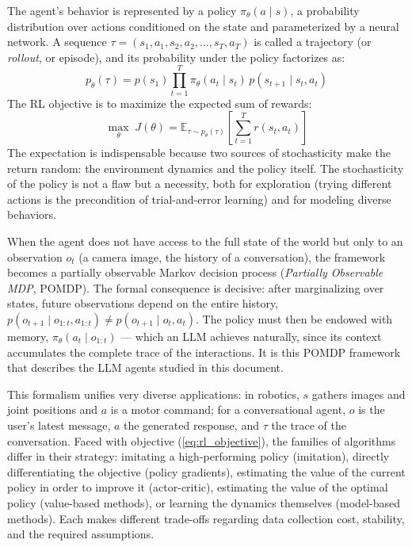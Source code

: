 \documentclass[11pt,a4paper]{article}
\begin{document}
The agent's behavior is represented by a policy $\pi_\theta(a \mid s)$, a probability distribution over actions conditioned on the state and parameterized by a neural network. A sequence $\tau = (s_1, a_1, s_2, a_2, \dots, s_T, a_T)$ is called a trajectory (or \emph{rollout}, or episode), and its probability under the policy factorizes as:
\begin{equation}
p_\theta(\tau) = p(s_1) \prod_{t=1}^{T} \pi_\theta(a_t \mid s_t)\, p(s_{t+1} \mid s_t, a_t)
\end{equation}
The RL objective is to maximize the expected sum of rewards:
\begin{equation}
\max_\theta \; J(\theta) = \mathbb{E}_{\tau \sim p_\theta(\tau)} \left[ \sum_{t=1}^{T} r(s_t, a_t) \right]
\label{eq:rl_objective}
\end{equation}
The expectation is indispensable because two sources of stochasticity make the return random: the environment dynamics and the policy itself. The stochasticity of the policy is not a flaw but a necessity, both for exploration (trying different actions is the precondition of trial-and-error learning) and for modeling diverse behaviors.

When the agent does not have access to the full state of the world but only to an observation $o_t$ (a camera image, the history of a conversation), the framework becomes a partially observable Markov decision process (\emph{Partially Observable MDP}, POMDP). The formal consequence is decisive: after marginalizing over states, future observations depend on the entire history, $p(o_{t+1} \mid o_{1:t}, a_{1:t}) \neq p(o_{t+1} \mid o_t, a_t)$. The policy must then be endowed with memory, $\pi_\theta(a_t \mid o_{1:t})$ — which an LLM achieves naturally, since its context accumulates the complete trace of the interactions. It is this POMDP framework that describes the LLM agents studied in this document.

This formalism unifies very diverse applications: in robotics, $s$ gathers images and joint positions and $a$ is a motor command; for a conversational agent, $o$ is the user's latest message, $a$ the generated response, and $\tau$ the trace of the conversation. Faced with objective (\ref{eq:rl_objective}), the families of algorithms differ in their strategy: imitating a high-performing policy (imitation), directly differentiating the objective (policy gradients), estimating the value of the current policy in order to improve it (actor-critic), estimating the value of the optimal policy (value-based methods), or learning the dynamics themselves (model-based methods). Each makes different trade-offs regarding data collection cost, stability, and the required assumptions.
\end{document}
